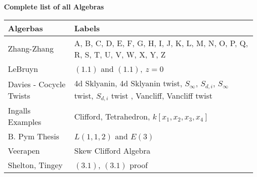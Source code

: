 \documentclass[12]{article}
\begin{document}
\pagebreak

\begin{center}
\textbf{\Large{Complete list of all Algebras}}
\end{center}\renewcommand{\arraystretch}{1.5}
\begin{longtable}[c]{|p{3.75cm}|p{6.75cm}|}
\toprule
 Algerbas & Labels \\[6pt] 
\endfirsthead 
  \hline 
Zhang-Zhang & A, B, C, D, E, F, G, H, I, J, K, L, M, N, O, P, Q, R, S, T, U, V, W, X, Y, Z \\[6pt]
\hline
LeBruyn & $(1.1)$ and $(1.1), \ z=0$\\[6pt]
\hline
Davies - Cocycle Twists & 4d Sklyanin, 4d Sklyanin twist, $S_\infty	$, $S_{d,i}$, $S_\infty$ twist, $S_{d,i}$ twist	, Vancliff, Vancliff twist \\[6pt]	
\hline
Ingalls Examples & Clifford, Tetrahedron, $k[x_1,x_2,x_3,x_4]$\\[6pt] 
\hline
B. Pym Thesis & $L(1,1,2)$ and $E(3)$ \\[6pt] 
\hline
Veerapen & Skew Clifford Algebra \\[6pt] 
\hline
Shelton, Tingey & $( 3.1 )$, $(3.1)$ proof \\[6pt] 
\bottomrule
\end{longtable}

\pagebreak
\end{document}
